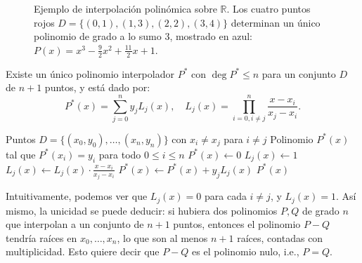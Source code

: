 \begin{figure}[!t]
	\centering
	\caption{Ejemplo de interpolación polinómica sobre $\mathbb{R}$. Los cuatro puntos rojos $D=\{(0,1),(1,3),(2,2),(3,4)\}$ determinan un único polinomio de grado a lo sumo 3, mostrado en azul: $P(x)=x^3-\frac{9}{2}x^2+\frac{11}{2}x+1$.}
	\label{fig:interpolacion-polinomio}
\end{figure}


\begin{theorem}
	Existe un único polinomio interpolador $P^*$ con $\deg P^* \leq n$ para un conjunto $D$ de $n + 1$ puntos, y está dado por:
	$$P^*(x) = \sum_{j=0}^{n} y_j L_j(x), \quad L_j(x) = \prod_{i=0, i \neq j}^{n} \frac{x - x_i}{x_j - x_i}.$$
\end{theorem}

\begin{algorithm}[h]
	\caption{Interpolación de Lagrange}
	\label{alg:lagrange-interpolation}
	\begin{algorithmic}[1]
		\Require Puntos $D = \{(x_0,y_0), \ldots, (x_n,y_n)\}$ con $x_i \neq x_j$ para $i \neq j$
		\Ensure Polinomio $P^*(x)$ tal que $P^*(x_i)=y_i$ para todo $0 \leq i \leq n$
		\State $P^*(x) \gets 0$
			\State $L_j(x) \gets 1$
					\State $L_j(x) \gets L_j(x)\cdot \frac{x - x_i}{x_j - x_i}$
				\EndIf
			\EndFor
			\State $P^*(x) \gets P^*(x) + y_jL_j(x)$
		\EndFor
		\State \Return $P^*(x)$
	\end{algorithmic}
\end{algorithm}

Intuitivamente, podemos ver que $L_j(x) = 0$ para cada $i \neq j$, y $L_j(x) = 1$. Así mismo, la unicidad se puede deducir: si hubiera dos polinomios $P, Q$ de grado $n$ que interpolan a un conjunto de $n + 1$ puntos, entonces el polinomio $P - Q$ tendría raíces en $x_0, \ldots, x_n$, lo que son al menos $n + 1$ raíces, contadas con multiplicidad. Esto quiere decir que $P - Q$ es el polinomio nulo, i.e., $P = Q$.
